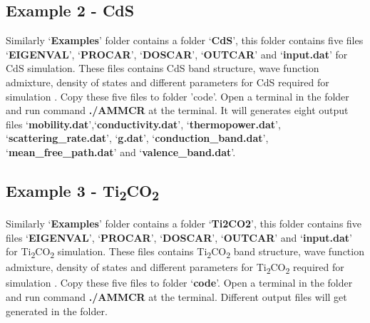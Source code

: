 \documentclass[12pt]{article}
\begin{document}
\subsection{Example 2 - CdS}
Similarly \lq \textbf{Examples}\rq \hspace{0.5mm} folder contains a folder \lq \textbf{CdS}\rq \hspace{0.5mm}, this folder contains five files \lq \textbf{EIGENVAL}\rq \hspace{0.5mm}, \lq \textbf{PROCAR}\rq \hspace{0.5mm}, \lq \textbf{DOSCAR}\rq \hspace{0.5mm}, \lq \textbf{OUTCAR}\rq \hspace{0.5mm} and \lq \textbf{input.dat}\rq \hspace{0.5mm} for CdS simulation. These files contains CdS band structure, wave function admixture, density of states and different parameters for CdS required for simulation \cite{anup2}. Copy these five files to folder 'code'. Open a terminal in the folder and run command \textbf{./AMMCR} at the terminal. It will generates eight output files \lq \textbf{mobility.dat}\rq,\lq \textbf{conductivity.dat}\rq, \lq \textbf{thermopower.dat}\rq, \lq \textbf{scattering\_rate.dat}\rq, \lq \textbf{g.dat}\rq, \lq \textbf{conduction\_band.dat}\rq, \lq \textbf{mean\_free\_path.dat}\rq \hspace{0.5mm} and \lq \textbf{valence\_band.dat}\rq. 

\subsection{Example 3 - Ti\textsubscript{2}CO\textsubscript{2}}
Similarly \lq \textbf{Examples}\rq \hspace{0.5mm} folder contains a folder \lq \textbf{Ti2CO2}\rq \hspace{0.5mm}, this folder contains five files \lq \textbf{EIGENVAL}\rq \hspace{0.5mm}, \lq \textbf{PROCAR}\rq \hspace{0.5mm}, \lq \textbf{DOSCAR}\rq \hspace{0.5mm}, \lq \textbf{OUTCAR}\rq \hspace{0.5mm} and \lq \textbf{input.dat}\rq \hspace{0.5mm} for Ti\textsubscript{2}CO\textsubscript{2} simulation. These files contains Ti\textsubscript{2}CO\textsubscript{2} band structure, wave function admixture, density of states and different parameters for Ti\textsubscript{2}CO\textsubscript{2} required for simulation \cite{anup3}. Copy these five files to folder \lq \textbf{code}\rq \hspace{0.5mm}. Open a terminal in the folder and run command \textbf{./AMMCR} at the terminal. Different output files will get generated in the folder.


\end{document}
